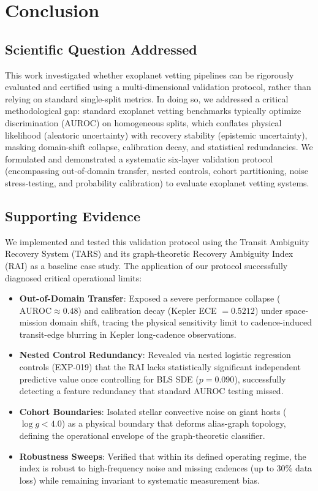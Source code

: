 \section{Conclusion} \label{sec:conclusion}

\subsection{Scientific Question Addressed} \label{sec:concl_question}
This work investigated whether exoplanet vetting pipelines can be rigorously evaluated and certified using a multi-dimensional validation protocol, rather than relying on standard single-split metrics. In doing so, we addressed a critical methodological gap: standard exoplanet vetting benchmarks typically optimize discrimination (AUROC) on homogeneous splits, which conflates physical likelihood (aleatoric uncertainty) with recovery stability (epistemic uncertainty), masking domain-shift collapse, calibration decay, and statistical redundancies. We formulated and demonstrated a systematic six-layer validation protocol (encompassing out-of-domain transfer, nested controls, cohort partitioning, noise stress-testing, and probability calibration) to evaluate exoplanet vetting systems.

\subsection{Supporting Evidence} \label{sec:concl_evidence}
We implemented and tested this validation protocol using the Transit Ambiguity Recovery System (TARS) and its graph-theoretic Recovery Ambiguity Index (RAI) as a baseline case study. The application of our protocol successfully diagnosed critical operational limits:
\begin{itemize}
\item \textbf{Out-of-Domain Transfer}: Exposed a severe performance collapse ($\text{AUROC} \approx 0.48$) and calibration decay (Kepler ECE $= 0.5212$) under space-mission domain shift, tracing the physical sensitivity limit to cadence-induced transit-edge blurring in Kepler long-cadence observations.
\item \textbf{Nested Control Redundancy}: Revealed via nested logistic regression controls (EXP-019) that the RAI lacks statistically significant independent predictive value once controlling for BLS SDE ($p = 0.090$), successfully detecting a feature redundancy that standard AUROC testing missed.
\item \textbf{Cohort Boundaries}: Isolated stellar convective noise on giant hosts ($\log g < 4.0$) as a physical boundary that deforms alias-graph topology, defining the operational envelope of the graph-theoretic classifier.
\item \textbf{Robustness Sweeps}: Verified that within its defined operating regime, the index is robust to high-frequency noise and missing cadences (up to 30\% data loss) while remaining invariant to systematic measurement bias.
\end{itemize}

